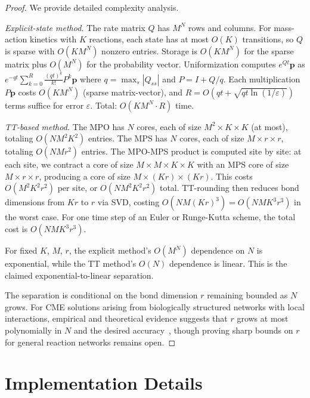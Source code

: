 \documentclass[11pt]{article}
\newcommand{\eps}{\varepsilon}
\begin{document}
\begin{proof}
We provide detailed complexity analysis.

\emph{Explicit-state method.}
The rate matrix $Q$ has $M^N$ rows and columns.
For mass-action kinetics with $K$ reactions, each state has at most
$O(K)$ transitions, so $Q$ is sparse with $O(KM^N)$ nonzero entries.
Storage is $O(KM^N)$ for the sparse matrix plus $O(M^N)$ for the
probability vector.
Uniformization computes $e^{Qt}\mathbf{p}$ as
$e^{-qt}\sum_{k=0}^{R}\frac{(qt)^k}{k!}P^k\mathbf{p}$
where $q = \max_s |Q_{ss}|$ and $P = I + Q/q$.
Each multiplication $P\mathbf{p}$ costs $O(KM^N)$ (sparse matrix-vector),
and $R = O(qt + \sqrt{qt\ln(1/\eps)})$ terms suffice for error $\eps$.
Total: $O(KM^N \cdot R)$ time.

\emph{TT-based method.}
The MPO has $N$ cores, each of size $M^2 \times K \times K$
(at most), totaling $O(NM^2 K^2)$ entries.
The MPS has $N$ cores, each of size $M \times r \times r$,
totaling $O(NMr^2)$ entries.
The MPO-MPS product is computed site by site:
at each site, we contract a core of size
$M \times M \times K \times K$ with an MPS core of size
$M \times r \times r$, producing a core of size
$M \times (Kr) \times (Kr)$.
This costs $O(M^2 K^2 r^2)$ per site, or $O(NM^2K^2r^2)$ total.
TT-rounding then reduces bond dimensions from $Kr$ to $r$ via SVD,
costing $O(NM(Kr)^3) = O(NMK^3r^3)$ in the worst case.
For one time step of an Euler or Runge-Kutta scheme, the total
cost is $O(NMK^3r^3)$.

For fixed $K$, $M$, $r$, the explicit method's $O(M^N)$ dependence
on $N$ is exponential, while the TT method's $O(N)$ dependence is
linear.
This is the claimed exponential-to-linear separation.

The separation is conditional on the bond dimension $r$ remaining
bounded as $N$ grows.
For CME solutions arising from biologically structured networks
with local interactions, empirical and theoretical evidence suggests
that $r$ grows at most polynomially in $N$ and the desired
accuracy~\cite{kazeev2014,ion2021}, though proving sharp bounds
on $r$ for general reaction networks remains open.
\end{proof}

\section{Implementation Details}\label{app:implementation}
\end{document}
